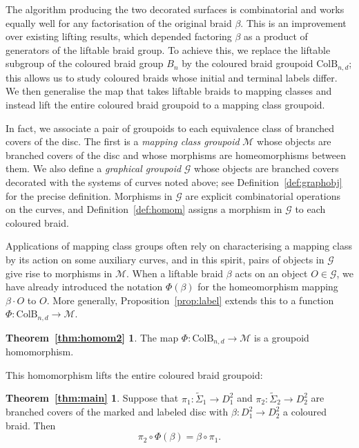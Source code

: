 \documentclass{amsart}
\theoremstyle{definition}
\def\ws{\widetilde{\Sigma}}
\newtheorem*{liftingthm2}{Theorem~\ref{thm:main}}
\newtheorem*{homomthm}{Theorem~\ref{thm:homom2}}
\begin{document}
The algorithm producing the  two decorated surfaces is combinatorial and works equally well for any factorisation of the original braid $\beta$.  This is an improvement over existing lifting results, which depended factoring $\beta$ as a product of generators of the liftable braid group.  To achieve this, we replace the liftable subgroup of the coloured braid group $B_n$ by the coloured braid groupoid $\text{ColB}_{n,d}$; this allows us to study coloured braids whose initial and terminal labels differ.  We then  generalise the map that takes liftable braids to mapping classes and instead lift the entire coloured braid groupoid to a mapping class groupoid.


In fact, we associate a pair of groupoids to each equivalence class of branched covers of the disc. The first is a \textit{mapping class groupoid} $\mathcal{M}$ whose objects are branched covers of the disc and whose morphisms are homeomorphisms between them.   We also define a \textit{graphical groupoid} $\mathcal{G}$ whose objects are branched covers decorated with the systems of curves  noted above; see Definition~\ref{def:graphobj} for the precise definition.  Morphisms in $\mathcal{G}$ are explicit combinatorial operations on the curves, and Definition~\ref{def:homom} assigns a morphism in $\mathcal{G}$ to each coloured braid.  

Applications of mapping class groups often rely on characterising a mapping class by its action on some auxiliary curves, and in this spirit, pairs of objects in $\mathcal{G}$  give rise to morphisms in $\mathcal{M}$.  When a liftable braid $\beta$ acts on an object $O\in \mathcal{G}$, we have already introduced the notation $\Phi(\beta)$ for the homeomorphism mapping $\beta\cdot O$ to $O$.  More generally, Proposition~\ref{prop:label} extends this to a function $\Phi:\text{ColB}_{n,d}\rightarrow \mathcal{M}$.
 

\begin{homomthm} The map $\Phi:\text{ColB}_{n,d}\rightarrow \mathcal{M}$ is a groupoid homomorphism. 
\end{homomthm}

This homomorphism lifts the entire coloured braid groupoid:
\begin{liftingthm2}  

Suppose that $\pi_1:\ws_1\rightarrow D^2_1$ and $\pi_2:\ws_2\rightarrow D^2_2$ are branched covers of the marked and labeled disc with $\beta: D^2_1\rightarrow D^2_2$ a coloured braid.  Then \[\pi_2\circ\Phi(\beta)=\beta\circ \pi_1.\] \end{liftingthm2}
\end{document}
